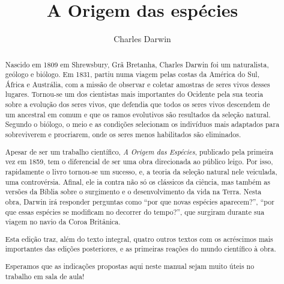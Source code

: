 \documentclass[11pt]{extarticle}
\begin{document}
\newcommand{\AutorLivro}{Charles Darwin}
\newcommand{\TituloLivro}{A Origem das espécies}
\newcommand{\Tema}{História da ciência}
\newcommand{\Genero}{Tratado científico}
\newcommand{\imagemCapa}{./images/PNLD0060-01.png}
\newcommand{\issnppub}{---}
\newcommand{\issnepub}{---}
\newcommand{\colaborador}{{Vicente Castro e Bruno Gradella}} 


\title{\TituloLivro}
\author{\AutorLivro}
\def\authornotes{\colaborador}

\date{}
\maketitle






\begin{abstract} 

Nascido em 1809 em Shrewsbury, Grã Bretanha, Charles Darwin foi um naturalista,
geólogo e biólogo. Em 1831, partiu numa viagem pelas costas da América do Sul,
África e Austrália, com a missão de observar e coletar amostras de seres vivos
desses lugares. Tornou-se um dos cientistas mais importantes do Ocidente pela
sua teoria sobre a evolução dos seres vivos, que defendia que todos os seres
vivos descendem de um ancestral em comum e que os ramos evolutivos são
resultados da seleção natural. Segundo o biólogo, o meio e as condições
selecionam os indivíduos mais adaptados para sobreviverem e procriarem, onde os
seres menos habilitados são eliminados.

Apesar de ser um trabalho científico, \emph{A Origem das Espécies}, publicado
pela primeira vez em 1859, tem o diferencial de ser uma obra direcionada ao
público leigo.  Por isso, rapidamente o livro tornou-se um sucesso, e, a teoria
da seleção natural nele veiculada, uma controvérsia. Afinal, ele ia contra não
só os clássicos da ciência, mas também as versões da Bíblia sobre o surgimento
e o desenvolvimento da vida na Terra.  Nesta obra, Darwin irá responder
perguntas como ``por que novas espécies aparecem?'', ``por que essas espécies se
modificam no decorrer do tempo?'', que surgiram durante sua viagem no navio da
Coroa Britânica. 

Esta edição traz, além do texto integral, quatro outros textos com os
acréscimos mais importantes das edições posteriores, e as primeiras reações do
mundo científico à obra. 

Esperamos que as indicações propostas aqui neste manual sejam muito úteis no
trabalho em sala de aula!

\end{abstract}
\end{document}
